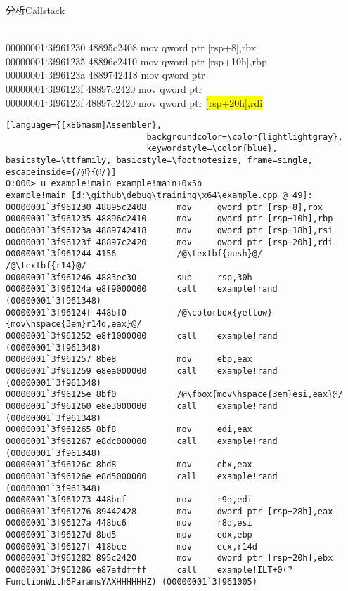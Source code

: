 \documentclass[UTF8,adobefonts,a4paper]{ctexart}
\begin{document}
\setlength{\parindent}{0em}
分析Callstack

{\small\texttt
\\
00000001`3f961230 48895c2408      mov     qword ptr [rsp+8],rbx\\
00000001`3f961235 48896c2410      mov     qword ptr {\color{blue}[rsp+10h],rbp}\\
00000001`3f96123a 4889742418      mov     qword ptr \\
00000001`3f96123f 48897c2420      mov     qword ptr \\
00000001`3f96123f 48897c2420      mov     qword ptr \colorbox{yellow}{[rsp+20h],rdi}
}

\small
\begin{lstlisting}[language={[x86masm]Assembler}, 
							backgroundcolor=\color{lightlightgray},
                            keywordstyle=\color{blue}, basicstyle=\ttfamily, basicstyle=\footnotesize, frame=single, escapeinside={/@}{@/}]
0:000> u example!main example!main+0x5b
example!main [d:\github\debug\training\x64\example.cpp @ 49]:
00000001`3f961230 48895c2408      mov     qword ptr [rsp+8],rbx
00000001`3f961235 48896c2410      mov     qword ptr [rsp+10h],rbp
00000001`3f96123a 4889742418      mov     qword ptr [rsp+18h],rsi
00000001`3f96123f 48897c2420      mov     qword ptr [rsp+20h],rdi
00000001`3f961244 4156            /@\textbf{push}@/    /@\textbf{r14}@/
00000001`3f961246 4883ec30        sub     rsp,30h
00000001`3f96124a e8f9000000      call    example!rand (00000001`3f961348)
00000001`3f96124f 448bf0          /@\colorbox{yellow}{mov\hspace{3em}r14d,eax}@/
00000001`3f961252 e8f1000000      call    example!rand (00000001`3f961348)
00000001`3f961257 8be8            mov     ebp,eax
00000001`3f961259 e8ea000000      call    example!rand (00000001`3f961348)
00000001`3f96125e 8bf0            /@\fbox{mov\hspace{3em}esi,eax}@/
00000001`3f961260 e8e3000000      call    example!rand (00000001`3f961348)
00000001`3f961265 8bf8            mov     edi,eax
00000001`3f961267 e8dc000000      call    example!rand (00000001`3f961348)
00000001`3f96126c 8bd8            mov     ebx,eax
00000001`3f96126e e8d5000000      call    example!rand (00000001`3f961348)
00000001`3f961273 448bcf          mov     r9d,edi
00000001`3f961276 89442428        mov     dword ptr [rsp+28h],eax
00000001`3f96127a 448bc6          mov     r8d,esi
00000001`3f96127d 8bd5            mov     edx,ebp
00000001`3f96127f 418bce          mov     ecx,r14d
00000001`3f961282 895c2420        mov     dword ptr [rsp+20h],ebx
00000001`3f961286 e87afdffff      call    example!ILT+0(?FunctionWith6ParamsYAXHHHHHHZ) (00000001`3f961005)
\end{lstlisting}
\end{document}
